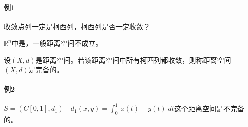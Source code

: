 \paragraph*{例1} \quad 收敛点列一定是柯西列，柯西列是否一定收敛？

$\mathbb{R}^n$中是，一般距离空间不成立。
\begin{definition}[完备距离空间]
    设$(X,d)$是距离空间。若该距离空间中所有柯西列都收敛，则称距离空间$(X,d)$是完备的。
\end{definition}

\paragraph*{例2} \quad $S=(C[0,1],d_1) \quad d_1(x,y)=\int_0^1|x(t)-y(t)|dt$这个距离空间是不完备的。

